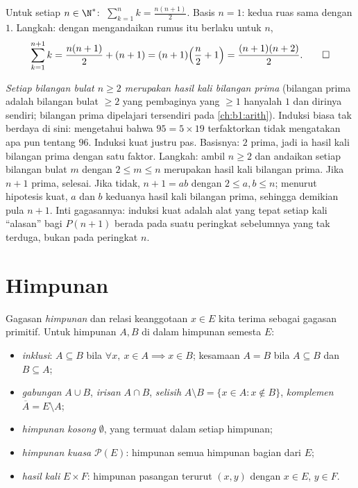 \begin{example}\label{ex:b1:logic:induction}
Untuk setiap $n \in \N^*$: $\;\sum_{k=1}^n k = \frac{n(n+1)}{2}$.
Basis $n = 1$: kedua ruas sama dengan $1$. Langkah: dengan
mengandaikan rumus itu berlaku untuk $n$,
\[
\sum_{k=1}^{n+1} k = \frac{n(n+1)}{2} + (n+1)
= (n+1)\Bigl(\frac n2 + 1\Bigr) = \frac{(n+1)(n+2)}{2}. \qedhere
\]
\end{example}

\begin{example}\label{ex:b1:logic:strongind}
\emph{Setiap bilangan bulat $n \geq 2$ merupakan hasil kali bilangan
prima} (bilangan prima adalah bilangan bulat $\geq 2$ yang pembaginya
yang $\geq 1$ hanyalah $1$ dan dirinya sendiri; bilangan prima
dipelajari tersendiri pada \cref{ch:b1:arith}). Induksi biasa tak
berdaya di sini: mengetahui bahwa $95 = 5 \times 19$ terfaktorkan
tidak mengatakan apa pun tentang $96$. Induksi kuat justru pas.
Basisnya: $2$ prima, jadi ia hasil kali bilangan prima dengan satu
faktor. Langkah: ambil $n \geq 2$ dan andaikan setiap bilangan bulat
$m$ dengan $2 \leq m \leq n$ merupakan hasil kali bilangan prima. Jika
$n + 1$ prima, selesai. Jika tidak, $n + 1 = ab$ dengan
$2 \leq a, b \leq n$; menurut hipotesis kuat, $a$ dan $b$ keduanya
hasil kali bilangan prima, sehingga demikian pula $n + 1$. Inti
gagasannya: induksi kuat adalah alat yang tepat setiap kali
``alasan'' bagi $P(n+1)$ berada pada suatu peringkat sebelumnya yang
tak terduga, bukan pada peringkat $n$.
\end{example}

\section{Himpunan}

\begin{definition}\label{def:b1:logic:sets}
Gagasan \emph{himpunan} dan relasi keanggotaan
$x \in E$ kita terima sebagai gagasan primitif. Untuk himpunan $A, B$
di dalam himpunan semesta $E$:
\begin{itemize}
  \item \emph{inklusi}: $A \subseteq B$ bila $\forall x,\ x \in A
        \implies x \in B$; kesamaan $A = B$ bila $A \subseteq B$ dan
        $B \subseteq A$;
  \item \emph{gabungan} $A \cup B$, \emph{irisan} $A \cap B$,
        \emph{selisih} $A \setminus B = \{x \in A : x \notin B\}$,
        \emph{komplemen} $\overline{A} = E \setminus A$;
  \item \emph{himpunan kosong} $\emptyset$, yang termuat dalam setiap
        himpunan;
  \item \emph{himpunan kuasa} $\mathcal{P}(E)$:
        himpunan semua himpunan bagian dari $E$;
  \item \emph{hasil kali} $E \times F$: himpunan pasangan terurut
        $(x, y)$ dengan $x \in E$, $y \in F$.
\end{itemize}
\end{definition}

